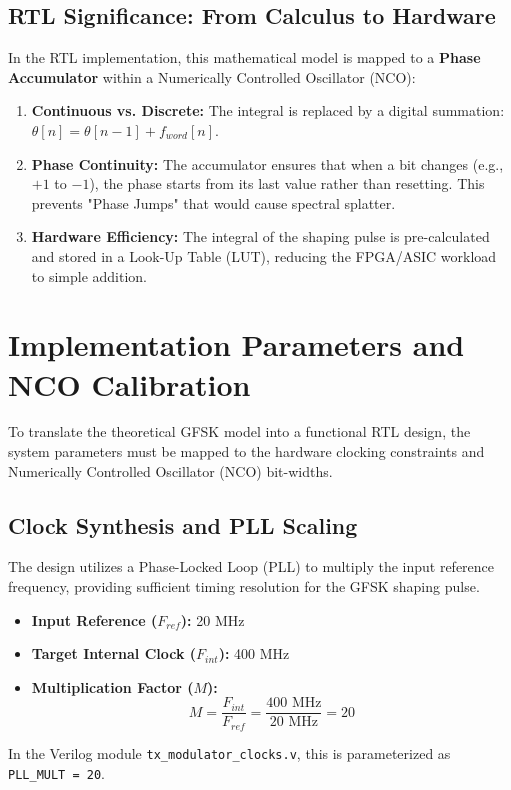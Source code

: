 \documentclass[12pt,singleside,a4paper]{report}
\begin{document}
\subsection{RTL Significance: From Calculus to Hardware}
In the RTL implementation, this mathematical model is mapped to a \textbf{Phase Accumulator} within a Numerically Controlled Oscillator (NCO):
\begin{enumerate}
    \item \textbf{Continuous vs. Discrete:} The integral is replaced by a digital summation: $\theta[n] = \theta[n-1] + f_{word}[n]$.
    \item \textbf{Phase Continuity:} The accumulator ensures that when a bit changes (e.g., $+1$ to $-1$), the phase starts from its last value rather than resetting. This prevents "Phase Jumps" that would cause spectral splatter.
    \item \textbf{Hardware Efficiency:} The integral of the shaping pulse is pre-calculated and stored in a Look-Up Table (LUT), reducing the FPGA/ASIC workload to simple addition.
\end{enumerate}

\section{Implementation Parameters and NCO Calibration}

To translate the theoretical GFSK model into a functional RTL design, the system parameters must be mapped to the hardware clocking constraints and Numerically Controlled Oscillator (NCO) bit-widths.

\subsection{Clock Synthesis and PLL Scaling}
The design utilizes a Phase-Locked Loop (PLL) to multiply the input reference frequency, providing sufficient timing resolution for the GFSK shaping pulse.
\begin{itemize}
    \item \textbf{Input Reference ($F_{ref}$):} 20 MHz
    \item \textbf{Target Internal Clock ($F_{int}$):} 400 MHz
    \item \textbf{Multiplication Factor ($M$):}
    \begin{equation}
    M = \frac{F_{int}}{F_{ref}} = \frac{400 \text{ MHz}}{20 \text{ MHz}} = 20
    \end{equation}
\end{itemize}
In the Verilog module \texttt{tx\_modulator\_clocks.v}, this is parameterized as \texttt{PLL\_MULT = 20}.
\end{document}
